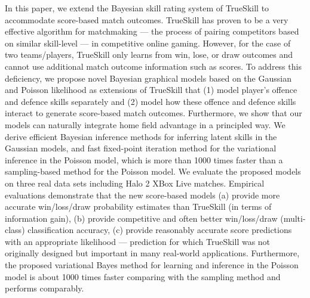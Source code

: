 In this paper, we extend the Bayesian skill rating system of TrueSkill to accommodate
score-based match outcomes. TrueSkill has proven to be a very
effective algorithm for matchmaking --- the process of pairing
competitors based on similar skill-level --- in competitive online
gaming. However, for the case of two teams/players, TrueSkill only
learns from win, lose, or draw outcomes and cannot use additional
match outcome information such as scores. To address this deficiency,
we propose novel Bayesian graphical models based on the Gaussian and Poisson likelihood as extensions of TrueSkill
that (1) model player's offence and defence skills separately and (2)
model how these offence and defence skills interact to generate
score-based match outcomes. Furthermore, we show that our models can naturally integrate home field advantage in a principled way. We derive efficient Bayesian inference methods for inferring latent skills in the Gaussian models, and fast fixed-point iteration method for the variational inference in the Poisson model, which is more than 1000 times faster than a sampling-based method for the Poisson model. We evaluate the proposed models on three real data sets including Halo 2 XBox Live matches. Empirical evaluations demonstrate that the new score-based models (a) provide
more accurate win/loss/draw probability estimates than TrueSkill (in terms
of information gain), (b) provide competitive and often better win/loss/draw (multi-class) classification
accuracy, (c) provide reasonably accurate score predictions with an appropriate
likelihood --- prediction for which TrueSkill was not originally designed but
important in many real-world applications. Furthermore, the proposed variational Bayes method for learning and inference in the Poisson model is about 1000 times faster comparing with the sampling method and performs comparably. 
